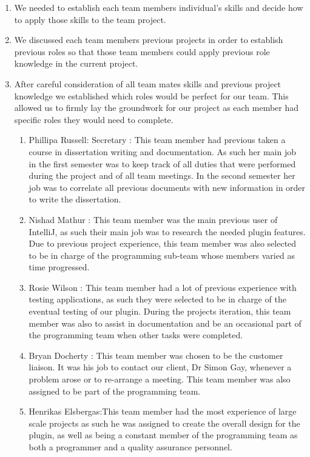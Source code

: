 \begin {enumerate}
	\item We needed to establish each team members individual's skills and decide how to apply those skills to the team project.
	\item We discussed each team members previous projects in order to establish previous roles so that those team members could apply previous role knowledge in the current project. 
	\item After careful consideration of all team mates skills and previous project knowledge we established which roles would be perfect for our team. This allowed us to firmly lay the groundwork for our project as each member had specific roles they would need to complete.
	\begin{enumerate}
		\item Phillipa Russell: Secretary : This team member had previous taken a course in dissertation writing and documentation. As such her main job in the first semester was to keep track of all duties that were performed during the project and of all team meetings. In the second semester her job was to correlate all previous documents with new information in order to write the dissertation.
		\item Nishad Mathur : This team member was the main previous user of IntelliJ, as such their main job was to research the needed plugin features. Due to previous project experience, this team member was also selected to be in charge of the programming  sub-team whose members varied as time progressed. 
		\item Rosie Wilson : This team member had a lot of previous experience with testing applications, as such they were selected to be in charge of the eventual testing of our plugin. During the projects iteration, this team member was also to assist in documentation and be an occasional part of the programming team when other tasks were completed. 
		\item Bryan Docherty : This team member was chosen to be the customer liaison. It was his job to contact our client, Dr Simon Gay, whenever a problem arose or to re-arrange a meeting. This team member was also assigned to be part of the programming team.
		\item Henrikas Elsbergas:This team member had the most experience of large scale projects as such he was assigned to create the overall design for the plugin,  as well as being a constant member of the  programming team  as both a programmer and a quality assurance personnel.
	\end{enumerate}
\end{enumerate}

